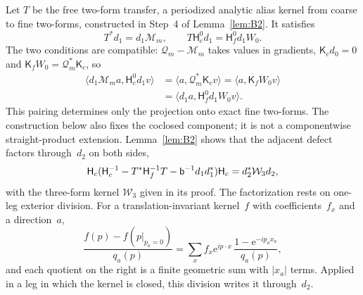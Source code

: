 Let $T$ be the free two-form transfer, a periodized analytic alias kernel from coarse to fine two-forms, constructed in Step~4 of Lemma~\ref{lem:B2}. It satisfies
\begin{equation*}
T^*d_1=d_1\mathcal M_m,\qquad T\mathsf H_c^0d_1=\mathsf H_f^0d_1W_0.
\end{equation*}
The two conditions are compatible: $\mathcal Q_m-\mathcal M_m$ takes values in gradients, $\mathsf K_cd_0=0$ and $\mathsf K_fW_0=\mathcal Q_m^*\mathsf K_c$, so
\begin{align*}
\langle d_1\mathcal M_ma,\mathsf H_c^0d_1v\rangle
&=\langle a,\mathcal Q_m^*\mathsf K_cv\rangle
=\langle a,\mathsf K_fW_0v\rangle\\
&=\langle d_1a,\mathsf H_f^0d_1W_0v\rangle.
\end{align*}
This pairing determines only the projection onto exact fine two-forms. The construction below also fixes the coclosed component; it is not a componentwise straight-product extension.
Lemma~\ref{lem:B2} shows that the adjacent defect factors through~$d_2$ on both sides,
\begin{equation}\label{eq:B-free-defect}
\mathsf H_c(\mathsf H_c^{-1}-T^*\mathsf H_f^{-1}T
 -\mathsf{b}^{-1}d_1d_1^*)\mathsf H_c=d_2^*\mathcal W_3d_2,
\end{equation}
with the three-form kernel $\mathcal W_3$ given in its proof. The factorization rests on one-leg exterior division. For a translation-invariant kernel~$f$ with coefficients~$f_x$ and a direction~$a$,
\begin{equation}\label{eq:B-exterior-division}
\frac{f(p)-f(p|_{p_a=0})}{q_a(p)}=\sum_x f_x \mathrm e^{ip\cdot x}\,\frac{1-\mathrm e^{-ip_ax_a}}{q_a(p)},
\end{equation}
and each quotient on the right is a finite geometric sum with $|x_a|$ terms. Applied in a leg in which the kernel is closed, this division writes it through~$d_2$.

